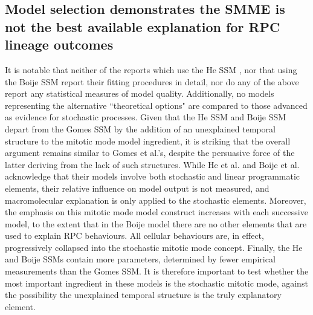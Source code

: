 \documentclass{ut-thesis}
\begin{document}
\begin{NoHyper}
 \section{Model selection demonstrates the SMME is not the best available explanation for RPC lineage outcomes}

It is notable that neither of the reports which use the He SSM \cite{He2012,Wan2016}, nor that using the Boije SSM \cite{Boije2015} report their fitting procedures in detail, nor do any of the above report any statistical measures of model quality. Additionally, no models representing the alternative ``theoretical options" are compared to those advanced as evidence for stochastic processes. Given that the He SSM and Boije SSM depart from the Gomes SSM by the addition of an unexplained temporal structure to the mitotic mode model ingredient, it is striking that the overall argument remains similar to Gomes et al.'s, despite the persuasive force of the latter deriving from the lack of such structures. While He et al. and Boije et al. acknowledge that their models involve both stochastic and linear programmatic elements, their relative influence on model output is not measured, and macromolecular explanation is only applied to the stochastic elements. Moreover, the emphasis on this mitotic mode model construct increases with each successive model, to the extent that in the Boije model there are no other elements that are used to explain RPC behaviours. All cellular behaviours are, in effect, progressively collapsed into the stochastic mitotic mode concept. Finally, the He and Boije SSMs contain more parameters, determined by fewer empirical measurements than the Gomes SSM. It is therefore important to test whether the most important ingredient in these models is the stochastic mitotic mode, against the possibility the unexplained temporal structure is the truly explanatory element.


\end{NoHyper}
\end{document}

